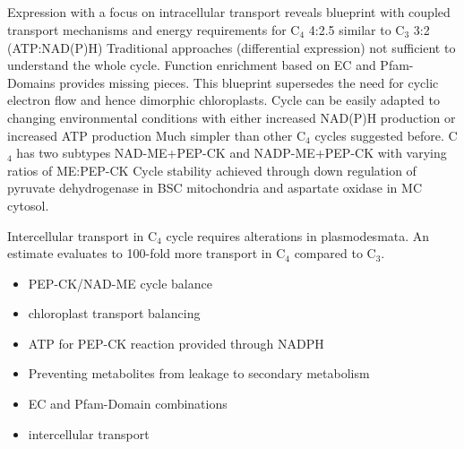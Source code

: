  \subsection{}
 Expression with a focus on intracellular transport reveals blueprint with coupled transport mechanisms and energy requirements for C$_4$ 4:2.5 similar to C$_3$ 3:2 (ATP:NAD(P)H)
 Traditional approaches (differential expression) not sufficient to understand the whole cycle.
 Function enrichment based on EC and Pfam-Domains provides missing pieces.
 This blueprint supersedes the need for cyclic electron flow and hence dimorphic chloroplasts.
 Cycle can be easily adapted to changing environmental conditions with either increased NAD(P)H production or increased ATP production
 Much simpler than other C$_4$ cycles suggested before.
 C$_4$ has two subtypes NAD-ME+PEP-CK and NADP-ME+PEP-CK with varying ratios of ME:PEP-CK
 Cycle stability achieved through down regulation of pyruvate dehydrogenase in BSC mitochondria and aspartate oxidase in MC cytosol.
 
 Intercellular transport in C$_4$ cycle requires alterations in plasmodesmata.
 An estimate evaluates to 100-fold more transport in C$_4$ compared to C$_3$.
 
	\begin{itemize}
		\item PEP-CK/NAD-ME cycle balance
		\item chloroplast transport balancing
		\item ATP for PEP-CK reaction provided through NADPH
		\item Preventing metabolites from leakage to secondary metabolism
		\item EC and Pfam-Domain combinations
		\item intercellular transport
	\end{itemize}
		